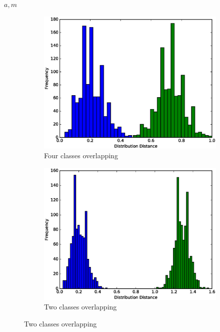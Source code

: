 \documentclass[conference]{IEEEtran}
\begin{document}
\begin{spacing}{0.9}
\begin{algorithm}
\begin{algorithmic}[1]
        \State \Return $a,m$
    \EndFunction

    
\end{algorithmic}
\end{algorithm}

\begin{figure}
\centering
\begin{subfigure}{.5\textwidth}
  \centering
  \includegraphics[scale=0.4]{profiler1.ps}
  \caption{Four classes overlapping}
  \label{fig:distributionDistance1}
\end{subfigure}%
\begin{subfigure}{.5\textwidth}
  \centering
  \includegraphics[scale=0.4]{profiler2.ps}
  \caption{Two classes overlapping}
  \label{fig:distributionDistance2}
\end{subfigure}


\end{figure}
\end{spacing}
\end{document}
